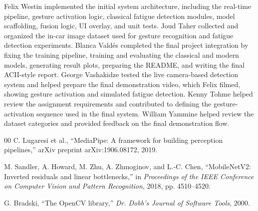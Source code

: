 \documentclass[conference]{IEEEtran}
\begin{document}
Felix Westin implemented the initial system architecture, including the real-time pipeline, gesture activation logic, classical fatigue detection modules, model scaffolding, fusion logic, UI overlay, and unit tests. Joud Taher collected and organized the in-car image dataset used for gesture recognition and fatigue detection experiments. Blanca Vald\'{e}s completed the final project integration by fixing the training pipeline, training and evaluating the classical and modern models, generating result plots, preparing the README, and writing the final ACII-style report. George Vashakidze tested the live camera-based detection system and helped prepare the final demonstration video, which Felix filmed, showing gesture activation and simulated fatigue detection. Kenny Tohme helped review the assignment requirements and contributed to defining the gesture-activation sequence used in the final system. William Yammine helped review the dataset categories and provided feedback on the final demonstration flow.

\begin{thebibliography}{00}
C. Lugaresi et al., ``MediaPipe: A framework for building perception pipelines,'' arXiv preprint arXiv:1906.08172, 2019.

M. Sandler, A. Howard, M. Zhu, A. Zhmoginov, and L.-C. Chen, ``MobileNetV2: Inverted residuals and linear bottlenecks,'' in \textit{Proceedings of the IEEE Conference on Computer Vision and Pattern Recognition}, 2018, pp. 4510--4520.

G. Bradski, ``The OpenCV library,'' \textit{Dr. Dobb's Journal of Software Tools}, 2000.
\end{thebibliography}
\end{document}
